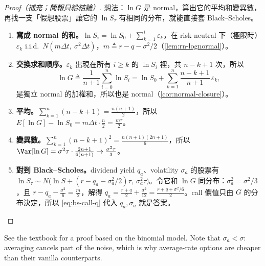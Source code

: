 \suppstart
{}

\begin{proof}[Proof（補充；簡報只給結論）]
	想法：$\ln G$ 是 normal，算出它的平均和變異數，再找一支「假想股票」讓它的 $\ln S_{\tau}$ 有相同的分布，就能直接套 Black--Scholes。
	\begin{enumerate}[(1),nosep]
		\item \textbf{寫成 normal 的和。}$\ln S_{i}=\ln S_{0}+\sum_{k=1}^{i}\varepsilon_{k}$，在 risk-neutral 下（極限時）$\varepsilon_{k}$ i.i.d.\ $N(m\Delta t,\ \sigma^{2}\Delta t)$，$m\triangleq r-q-\sigma^{2}/2$（\autoref{lem:rn-lognormal}）。
		\item \textbf{交換求和順序。}$\varepsilon_{k}$ 出現在所有 $i\ge k$ 的 $\ln S_{i}$ 裡，共 $n-k+1$ 次，所以
		\[
			\ln G\triangleq\frac{1}{n+1}\sum_{i=0}^{n}\ln S_{i}=\ln S_{0}+\sum_{k=1}^{n}\frac{n-k+1}{n+1}\,\varepsilon_{k} ,
		\]
		是獨立 normal 的加權和，所以也是 normal（\autoref{cor:normal-closure}）。
		\item \textbf{平均。}$\sum_{k=1}^{n}(n-k+1)=\frac{n(n+1)}{2}$，所以 $E[\ln G]-\ln S_{0}=m\Delta t\cdot\frac n2=\frac{m\tau}{2}$。
		\item \textbf{變異數。}$\sum_{k=1}^{n}(n-k+1)^{2}=\frac{n(n+1)(2n+1)}{6}$，所以 $\Var[\ln G]=\sigma^{2}\tau\cdot\frac{2n+1}{6(n+1)}\to\frac{\sigma^{2}\tau}{3}$。
		\item \textbf{對到 Black--Scholes。}dividend yield $q_{a}$、volatility $\sigma_{a}$ 的股票有 $\ln S_{\tau}\sim N\bigl(\ln S+(r-q_{a}-\sigma_{a}^{2}/2)\tau,\ \sigma_{a}^{2}\tau\bigr)$。令它和 $\ln G$ 同分布：$\sigma_{a}^{2}=\sigma^{2}/3$，且 $r-q_{a}-\frac{\sigma^{2}}{6}=\frac m2$，解得 $q_{a}=\frac{r+q}{2}+\frac{\sigma^{2}}{12}=\frac{r+q+\sigma^{2}/6}{2}$。call 價值只由 $G$ 的分布決定，所以 \eqref{eq:bs-call-q} 代入 $q_{a},\sigma_{a}$ 就是答案。
	\end{enumerate}
\end{proof}
\suppend

See the textbook for a proof based on the binomial model.
\suppstart
Note that $\sigma_{a}<\sigma$: averaging cancels part of the noise, which is why average-rate options are cheaper than their vanilla counterparts.


